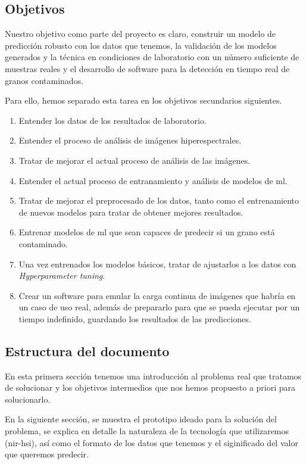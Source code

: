 \subsection{Objetivos}

Nuestro objetivo como parte del proyecto es claro, construir un modelo de predicción robusto con los datos que tenemos, la validación de los modelos generados y la técnica en
condiciones de laboratorio con un número suficiente de muestras reales y el desarrollo de software para la detección en tiempo real de granos contaminados. 

Para ello, hemos separado esta tarea en los objetivos secundarios siguientes. 

\begin{enumerate}
    \item Entender los datos de los resultados de laboratorio.
    \item Entender el proceso de análisis de imágenes hiperespectrales.
    \item Tratar de mejorar el actual proceso de análisis de las imágenes.
    \item Entender el actual proceso de entranamiento y análisis de modelos de \gls{ml}.
    \item Tratar de mejorar el preprocesado de los datos, tanto como el entrenamiento de nuevos modelos para tratar de obtener mejores resultados.
    \item Entrenar modelos de \gls{ml} que sean capaces de predecir si un grano está contaminado. 
    \item Una vez entrenados los modelos básicos, tratar de ajustarlos a los datos con \textit{Hyperparameter tuning}.
    \item Crear un software para emular la carga continua de imágenes que habría en un caso de uso real, además de prepararlo para que se pueda ejecutar por un tiempo indefinido, guardando los resultados de las predicciones.
\end{enumerate}

\subsection{Estructura del documento}

En esta primera sección tenemos una introducción al problema real que tratamos de solucionar y los objetivos intermedios que nos hemos propuesto a priori para solucionarlo.

En la siguiente sección, se muestra el prototipo ideado para la solución del problema, se explica en detalle la naturaleza de la tecnología que utilizaremos (\gls{nir-hsi}), así como el formato de los datos que tenemos y el siginificado del valor que queremos predecir.

